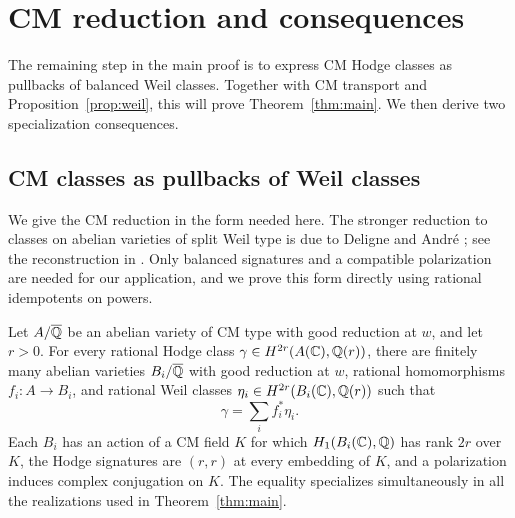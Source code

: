 \section{CM reduction and consequences}
\label{sec:reduction}

The remaining step in the main proof is to express CM Hodge classes
as pullbacks of balanced Weil classes.  Together with CM transport
and Proposition~\ref{prop:weil}, this will prove
Theorem~\ref{thm:main}.  We then derive two specialization consequences.

\subsection{CM classes as pullbacks of Weil classes}

We give the CM reduction in the form needed here.  The stronger
reduction to classes on abelian varieties of split Weil type is due to
Deligne and Andr\'e \cite{Andre1992}; see the reconstruction in
\cite[Theorem~1 and Section~4]{Milne2020}. Only balanced signatures
and a compatible polarization are needed for our application, and
we prove this form directly using rational idempotents on powers.

\begin{lemma}[CM reduction]
\label{lem:cm-reduction}
Let $A/\overline{\mathbb Q}$ be an abelian variety of CM type with good reduction at $w$,
and let $r>0$.  For every rational Hodge class
$\gamma\in H^{2r}(A(\mathbb C),\mathbb Q(r))$, there are finitely many abelian varieties
$B_i/\overline{\mathbb Q}$ with good reduction at $w$, rational homomorphisms
$f_i\colon A\to B_i$, and rational Weil classes
$\eta_i\in H^{2r}(B_i(\mathbb C),\mathbb Q(r))$ such that
\begin{equation}
\label{eq:cm-pullback-decomposition}
                 \gamma=\sum_i f_i^*\eta_i.
\end{equation}
Each $B_i$ has an action of a CM field $K$ for which $H_1(B_i(\mathbb C),\mathbb Q)$
has rank $2r$ over $K$, the Hodge signatures are $(r,r)$ at every
embedding of $K$, and a polarization induces complex conjugation on $K$.
The equality specializes simultaneously in all the realizations used in
Theorem~\ref{thm:main}.
\end{lemma}

